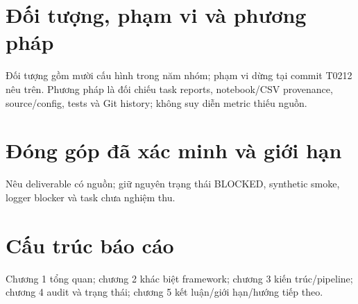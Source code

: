 \section*{Đối tượng, phạm vi và phương pháp}
Đối tượng gồm mười cấu hình trong năm nhóm; phạm vi dừng tại commit T0212 nêu trên. Phương pháp là đối chiếu task reports, notebook/CSV provenance, source/config, tests và Git history; không suy diễn metric thiếu nguồn.

\section*{Đóng góp đã xác minh và giới hạn}
Nêu deliverable có nguồn; giữ nguyên trạng thái BLOCKED, synthetic smoke, logger blocker và task chưa nghiệm thu.

\section*{Cấu trúc báo cáo}
Chương 1 tổng quan; chương 2 khác biệt framework; chương 3 kiến trúc/pipeline; chương 4 audit và trạng thái; chương 5 kết luận/giới hạn/hướng tiếp theo.